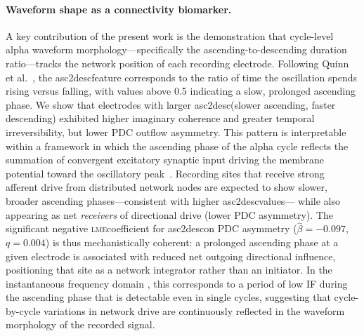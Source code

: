 \documentclass[11pt, a4paper]{article}
\newcommand{\lme}{\textsc{lme}}
\newcommand{\asc}{asc2desc}
\begin{document}
\paragraph{Waveform shape as a connectivity biomarker.}
A key contribution of the present work is the demonstration that cycle-level
alpha waveform morphology---specifically the ascending-to-descending duration
ratio---tracks the network position of each recording electrode. Following
Quinn et al.~\citeyearpar{quinn2021within}, the \asc feature corresponds to
the ratio of time the oscillation spends rising versus falling, with values
above 0.5 indicating a slow, prolonged ascending phase. We show that
electrodes with larger \asc (slower ascending, faster descending) exhibited
higher imaginary coherence and greater temporal irreversibility, but lower PDC
outflow asymmetry. This pattern is interpretable within a framework in which
the ascending phase of the alpha cycle reflects the summation of convergent
excitatory synaptic input driving the membrane potential toward the oscillatory
peak~\citep{cole2017brain, schaworonkow2019waveform}. Recording sites that
receive strong afferent drive from distributed network nodes are expected to
show slower, broader ascending phases---consistent with higher \asc values---
while also appearing as net \emph{receivers} of directional drive (lower PDC
asymmetry). The significant negative \lme coefficient for \asc on PDC
asymmetry ($\hat{\beta} = -0.097$, $q = 0.004$) is thus mechanistically
coherent: a prolonged ascending phase at a given electrode is associated with
reduced net outgoing directional influence, positioning that site as a network
integrator rather than an initiator. In the instantaneous frequency domain
\citep{quinn2021within}, this corresponds to a period of low IF during the
ascending phase that is detectable even in single cycles, suggesting that
cycle-by-cycle variations in network drive are continuously reflected in the
waveform morphology of the recorded signal.
\end{document}
